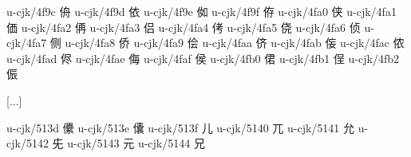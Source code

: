 \begin{multicols}{2}
u-cjk/4f9c	{\cjk{}侜}	 
u-cjk/4f9d	{\cjk{}依}	 
u-cjk/4f9e	{\cjk{}侞}	 
u-cjk/4f9f	{\cjk{}侟}	 
u-cjk/4fa0	{\cjk{}侠}	 
u-cjk/4fa1	{\cjk{}価}	 
u-cjk/4fa2	{\cjk{}侢}	 
u-cjk/4fa3	{\cjk{}侣}	 
u-cjk/4fa4	{\cjk{}侤}	 
u-cjk/4fa5	{\cjk{}侥}	 
u-cjk/4fa6	{\cjk{}侦}	 
u-cjk/4fa7	{\cjk{}侧}	 
u-cjk/4fa8	{\cjk{}侨}	 
u-cjk/4fa9	{\cjk{}侩}	 
u-cjk/4faa	{\cjk{}侪}	 
u-cjk/4fab	{\cjk{}侫}	 
u-cjk/4fac	{\cjk{}侬}	 
u-cjk/4fad	{\cjk{}侭}	 
u-cjk/4fae	{\cjk{}侮}	 
u-cjk/4faf	{\cjk{}侯}	 
u-cjk/4fb0	{\cjk{}侰}	 
u-cjk/4fb1	{\cjk{}侱}	 
u-cjk/4fb2	{\cjk{}侲}	 
 
[...] 
 
u-cjk/513d	{\cjk{}儽}	 
u-cjk/513e	{\cjk{}儾}	 
u-cjk/513f	{\cjk{}儿}	 
u-cjk/5140	{\cjk{}兀}	 
u-cjk/5141	{\cjk{}允}	 
u-cjk/5142	{\cjk{}兂	} 
u-cjk/5143	{\cjk{}元}	 
u-cjk/5144	{\cjk{}兄}	 
 

\end{multicols}

